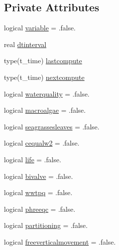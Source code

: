 \subsection*{Private Attributes}
\begin{DoxyCompactItemize}
\item 
logical \mbox{\hyperlink{structmodulewaterproperties_1_1t__evolution_ae4f270adc1a08fec8155e5facf4dc46f}{variable}} = .false.
\item 
real \mbox{\hyperlink{structmodulewaterproperties_1_1t__evolution_a8ef1798ae71e99976d8cc299c307f09c}{dtinterval}}
\item 
type(t\+\_\+time) \mbox{\hyperlink{structmodulewaterproperties_1_1t__evolution_aac5959ed55b096bb10e51072ff804438}{lastcompute}}
\item 
type(t\+\_\+time) \mbox{\hyperlink{structmodulewaterproperties_1_1t__evolution_aa14d1ff28d1238d20e8bb638ac23b4c9}{nextcompute}}
\item 
logical \mbox{\hyperlink{structmodulewaterproperties_1_1t__evolution_a7136cba6e3269b14ed5d59907a265627}{waterquality}} = .false.
\item 
logical \mbox{\hyperlink{structmodulewaterproperties_1_1t__evolution_a37719a6d681bfbd004f4ee2bc474b573}{macroalgae}} = .false.
\item 
logical \mbox{\hyperlink{structmodulewaterproperties_1_1t__evolution_a3d0d36bb0026a84ead3415233c23b813}{seagrassesleaves}} = .false.
\item 
logical \mbox{\hyperlink{structmodulewaterproperties_1_1t__evolution_a6d9698e5a6aaa7f90efd2d8c587e373b}{cequalw2}} = .false.
\item 
logical \mbox{\hyperlink{structmodulewaterproperties_1_1t__evolution_ab279372217e020c9b628673d33ca5a69}{life}} = .false.
\item 
logical \mbox{\hyperlink{structmodulewaterproperties_1_1t__evolution_ab68b2a4cae487945491454842f53e2b8}{bivalve}} = .false.
\item 
logical \mbox{\hyperlink{structmodulewaterproperties_1_1t__evolution_a1a8dad274beda6ce6b589634627c21c0}{wwtpq}} = .false.
\item 
logical \mbox{\hyperlink{structmodulewaterproperties_1_1t__evolution_aed702d75279159611a37ab2e83954fc0}{phreeqc}} = .false.
\item 
logical \mbox{\hyperlink{structmodulewaterproperties_1_1t__evolution_ac98d2eed9b17c8b5b5f5f59f96e74d9f}{partitioning}} = .false.
\item 
logical \mbox{\hyperlink{structmodulewaterproperties_1_1t__evolution_a91c042b41beb17d1e3a9bff47f3c54d2}{freeverticalmovement}} = .false.

\end{DoxyCompactItemize}
